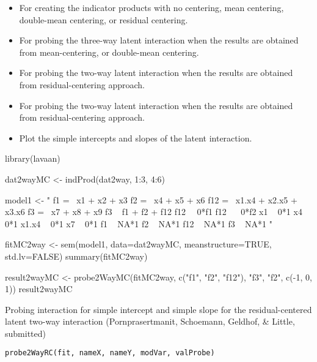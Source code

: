 \documentclass[a4paper]{book}
\begin{document}
\begin{SeeAlso}\relax
\begin{itemize}

\item {} For creating the indicator products with no centering, mean centering, double-mean centering, or residual centering.
\item {} For probing the three-way latent interaction when the results are obtained from mean-centering, or double-mean centering.
\item {} For probing the two-way latent interaction when the results are obtained from residual-centering approach.
\item {} For probing the two-way latent interaction when the results are obtained from residual-centering approach.
\item {} Plot the simple intercepts and slopes of the latent interaction.

\end{itemize}

\end{SeeAlso}
%
\begin{Examples}
\begin{ExampleCode}
library(lavaan) 

dat2wayMC <- indProd(dat2way, 1:3, 4:6)

model1 <- "
f1 =~ x1 + x2 + x3
f2 =~ x4 + x5 + x6
f12 =~ x1.x4 + x2.x5 + x3.x6
f3 =~ x7 + x8 + x9
f3 ~ f1 + f2 + f12
f12 ~~0*f1
f12 ~~ 0*f2
x1 ~ 0*1
x4 ~ 0*1
x1.x4 ~ 0*1
x7 ~ 0*1
f1 ~ NA*1
f2 ~ NA*1
f12 ~ NA*1
f3 ~ NA*1
"

fitMC2way <- sem(model1, data=dat2wayMC, meanstructure=TRUE, std.lv=FALSE)
summary(fitMC2way)

result2wayMC <- probe2WayMC(fitMC2way, c("f1", "f2", "f12"), "f3", "f2", c(-1, 0, 1))
result2wayMC
\end{ExampleCode}
\end{Examples}
%
\begin{Description}\relax
Probing interaction for simple intercept and simple slope for the residual-centered latent two-way interaction (Pornprasertmanit, Schoemann, Geldhof, \& Little, submitted)
\end{Description}
%
\begin{Usage}
\begin{verbatim}
probe2WayRC(fit, nameX, nameY, modVar, valProbe)
\end{verbatim}
\end{Usage}
\end{document}

